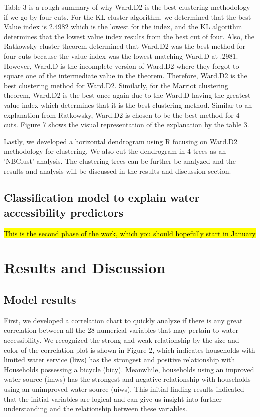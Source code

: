 \documentclass[10pt,twoside]{article}
\numberwithin{equation}{section}
\newcommand{\?}{\stackrel{?}{=}}
\begin{document}
Table 3 is a rough summary of why Ward.D2 is the best clustering methodology if we go by four cuts. For the KL cluster algorithm, we determined that the best Value index is 2.4982 which is the lowest for the index, and the KL algorithm determines that the lowest value index results from the best cut of four. Also, the Ratkowsky cluster theorem determined that Ward.D2 was the best method for four cuts because the value index was the lowest matching Ward.D at .2981. However, Ward.D is the incomplete version of Ward.D2 where they forgot to square one of the intermediate value in the theorem. Therefore, Ward.D2 is the best clustering method for Ward.D2. Similarly, for the Marriot clustering theorem, Ward.D2 is the best once again due to the Ward.D having the greatest value index which determines that it is the best clustering method. Similar to an explanation from Ratkowsky, Ward.D2 is chosen to be the best method for 4 cuts. Figure 7 shows the visual representation of the explanation by the table 3. 

Lastly, we developed a horizontal dendrogram using R focusing on Ward.D2 methodology for clustering. We also cut the dendrogram in 4 trees as an 'NBClust' analysis. The clustering trees can be further be analyzed and the results and analysis will be discussed in the results and discussion section. 



\subsection*{Classification model to explain water accessibility predictors}
\hl{This is the second phase of the work, which you should hopefully start in January}


\section*{Results and Discussion}

\subsection*{Model results}
First, we developed a correlation chart to quickly analyze if there is any great correlation between all the 28 numerical variables that may pertain to water accessibility. We recognized the strong and weak relationship by the size and color of the correlation plot is shown in Figure 2, which indicates households with limited water service (liws) has the strongest and positive relationship with Households possessing a bicycle (bicy). Meanwhile, households using an improved water source (imws) has the strongest and negative relationship with households using an unimproved water source (uiws). This initial finding results indicated that the initial variables are logical and can give us insight into further understanding and the relationship between these variables. 
\end{document}
